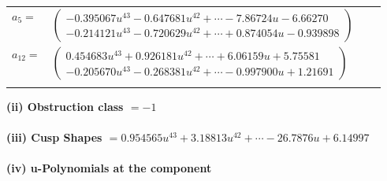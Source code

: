 \documentclass[1p]{elsarticle_modified}
\theoremstyle{definition}
\begin{document}
\begin{tabular}{m{7pt} m{180pt} m{7pt} m{180pt} }
\flushright $a_{5}=$&$\begin{pmatrix}-0.395067 u^{43}-0.647681 u^{42}+\cdots-7.86724 u-6.66270\\-0.214121 u^{43}-0.720629 u^{42}+\cdots+0.874054 u-0.939898\end{pmatrix}$ \\
\flushright $a_{12}=$&$\begin{pmatrix}0.454683 u^{43}+0.926181 u^{42}+\cdots+6.06159 u+5.75581\\-0.205670 u^{43}-0.268381 u^{42}+\cdots-0.997900 u+1.21691\end{pmatrix}$\\&\end{tabular}
\flushleft \textbf{(ii) Obstruction class $= -1$}\\~\\
\flushleft \textbf{(iii) Cusp Shapes $= 0.954565 u^{43}+3.18813 u^{42}+\cdots-26.7876 u+6.14997$}\\~\\
\newpage\renewcommand{\arraystretch}{1}
\flushleft \textbf{(iv) u-Polynomials at the component}\newline \\
\end{document}
